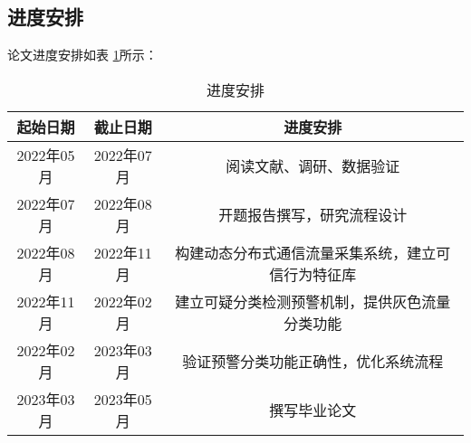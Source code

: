  
\subsection{进度安排}
论文进度安排如表 \ref{table:进度安排}所示：


\begin{table}[htbp]
	\centering
	\caption{进度安排}\label{table:进度安排}
	\vspace{0.5em}\wuhao
	\begin{tabular}{ccc}
		\toprule
		起始日期        & 截止日期     & 进度安排    \\
		\midrule
		2022年05月           & 2022年07月           & 阅读文献、调研、数据验证      \\
		2022年07月          & 2022年08月      & 开题报告撰写，研究流程设计  \\
		2022年08月         & 2022年11月        & 构建动态分布式通信流量采集系统，建立可信行为特征库  \\
		2022年11月         & 2022年02月     & 建立可疑分类检测预警机制，提供灰色流量分类功能  \\
		2022年02月           & 2023年03月   & 验证预警分类功能正确性，优化系统流程 \\
		2023年03月          & 2023年05月     &      撰写毕业论文     \\


		\bottomrule
	\end{tabular}
\end{table}


\FloatBarrier





